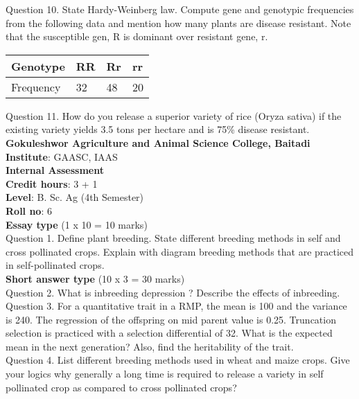 \documentclass[12pt]{article}\usepackage[]{graphicx}\usepackage[]{color}
\begin{document}
Question 10. State Hardy-Weinberg law. Compute gene and genotypic frequencies from the following data and mention how many plants are disease resistant. Note that the susceptible gen, R is dominant over resistant gene, r.\\ 
\begin{table}[H]
\centering\begingroup\fontsize{8}{10}\selectfont

\begin{tabular}[t]{llll}
\toprule
Genotype & RR & Rr & rr\\
\midrule
Frequency & 32 & 48 & 20\\
\bottomrule
\end{tabular}
\endgroup{}
\end{table}
Question 11. How do you release a superior variety of rice (Oryza sativa) if the existing variety yields 3.5 tons per hectare and is 75\% disease resistant.\\
\clearpage 
{\centering \Large{\textbf{Gokuleshwor Agriculture and Animal Science College, Baitadi}} \\[0.25cm]
            \textbf{Institute}: GAASC, IAAS \\[0.2cm]
            \textbf{Internal Assessment} \\[0.2cm]} 
\textbf{Credit hours}: 3 + 1 \\ 
\textbf{Level}: B. Sc. Ag (4th Semester) \\
\textbf{Roll no}: 6 \\[0.5cm] 
\textbf{Essay type} (1 x 10 = 10 marks) \\
Question 1. Define plant breeding. State different breeding methods in self and cross pollinated crops. Explain with diagram breeding methods that are practiced in self-pollinated crops.\\
\textbf{Short answer type} (10 x 3 = 30 marks) \\
Question 2. What is inbreeding depression ? Describe the effects of inbreeding.\\
Question 3. For a quantitative trait in a RMP, the mean is 100 and the variance is 240. The regression of the offspring on mid parent value is 0.25. Truncation selection is practiced with a selection differential of 32. What is the expected mean in the next generation? Also, find the heritability of the trait.\\
Question 4. List different breeding methods used in wheat and maize crops. Give your logics why generally a long time is required to release a variety in self pollinated crop as compared to cross pollinated crops?\\
\end{document}
